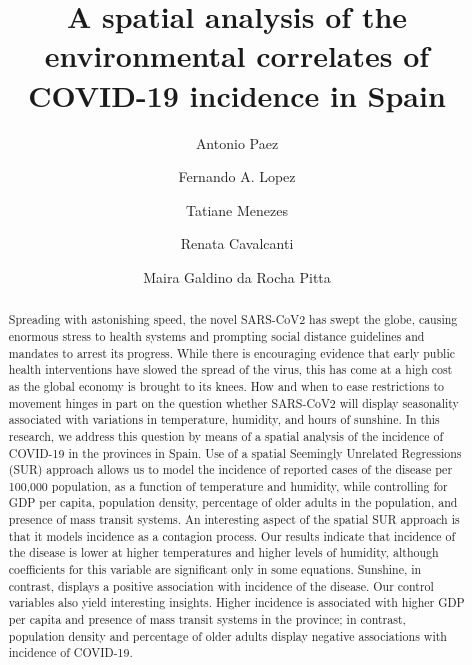 \documentclass[]{elsarticle} %
\begin{document}
\begin{frontmatter}

  \title{A spatial analysis of the environmental correlates of COVID-19 incidence
in Spain}
    \author[McMaster University]{Antonio Paez}
    \author[Universidad Politecnica de Cartagena]{Fernando A. Lopez}
    \author[Departamento de Economia]{Tatiane Menezes}
    \author[Nucleo de Pesquisa]{Renata Cavalcanti}
    \author[Nucleo de Pesquisa]{Maira Galdino da Rocha Pitta}
      \address[McMaster University]{School of Geography and Earth Sciences, McMaster University, 1281 Main
St W, Hamilton, ON, L8S 4K1, Canada}
    \address[Universidad Politecnica de Cartagena]{Departamento de Metodos Cuantitativos, Ciencias Juridicas, y Lenguas
Modernas, Universidad Politecnica de Cartagena, Calle Real Numero 3,
30201, Cartagena, Murcia, Spain}
    \address[Departamento de Economia]{Departamento de Economia, Universidade Federal de Pernambuco, Av dos
Economistas, s/n - Cidade Universitária, Recife - PE, 50670-901, Brasil}
    \address[Nucleo de Pesquisa]{Núcleo de Pesquisa em Inovação Terapêutica NUPIT / UFPE, Av.
Prof.~Moraes Rego, 1235 - Cidade Universitária, Recife, PE, CEP
50670-901, Brazil}
  
  \begin{abstract}
  Spreading with astonishing speed, the novel SARS-CoV2 has swept the
  globe, causing enormous stress to health systems and prompting social
  distance guidelines and mandates to arrest its progress. While there is
  encouraging evidence that early public health interventions have slowed
  the spread of the virus, this has come at a high cost as the global
  economy is brought to its knees. How and when to ease restrictions to
  movement hinges in part on the question whether SARS-CoV2 will display
  seasonality associated with variations in temperature, humidity, and
  hours of sunshine. In this research, we address this question by means
  of a spatial analysis of the incidence of COVID-19 in the provinces in
  Spain. Use of a spatial Seemingly Unrelated Regressions (SUR) approach
  allows us to model the incidence of reported cases of the disease per
  100,000 population, as a function of temperature and humidity, while
  controlling for GDP per capita, population density, percentage of older
  adults in the population, and presence of mass transit systems. An
  interesting aspect of the spatial SUR approach is that it models
  incidence as a contagion process. Our results indicate that incidence of
  the disease is lower at higher temperatures and higher levels of
  humidity, although coefficients for this variable are significant only
  in some equations. Sunshine, in contrast, displays a positive
  association with incidence of the disease. Our control variables also
  yield interesting insights. Higher incidence is associated with higher
  GDP per capita and presence of mass transit systems in the province; in
  contrast, population density and percentage of older adults display
  negative associations with incidence of COVID-19.
  \end{abstract}
  

\end{frontmatter}
\end{document}
